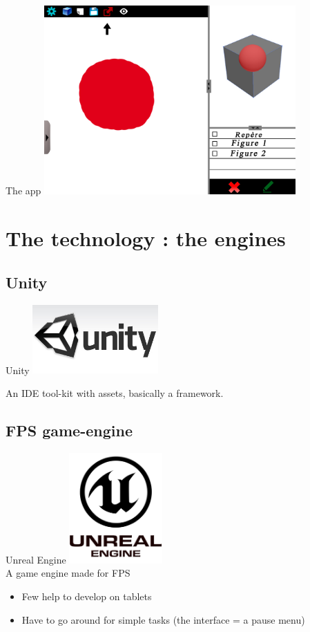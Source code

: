 \documentclass[a4paper,10pt]{beamer}
\begin{document}
			\begin{frame}{The app}
				\includegraphics[height=205pt]{maquette/maquette_8.png}
			\end{frame}
	
	\section{The technology : the engines}
	
		\subsection{Unity}
		
			\begin{frame}{Unity}
				\includegraphics[height=75pt]{images/Logo_Unity.jpg}
				
				 An IDE tool-kit with assets, basically a framework. 
			\end{frame}
			
		\subsection{FPS game-engine}
		
			\begin{frame}{Unreal Engine}
				\includegraphics[height=120pt]{images/Unreal_Engine.png}\\
				A game engine made for FPS
				\begin{itemize}
					\item Few help to develop on tablets
					\item Have to go around for simple tasks (the interface = a pause menu)
				\end{itemize}
			\end{frame}
			
\end{document}
